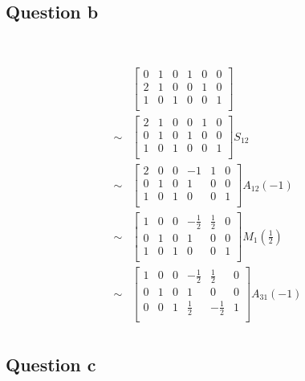 \documentclass{article}
\begin{document}
\subsection{Question b}

~

\begin{equation*}
\begin{split}
&\left[\begin{array}{ccc|ccc}
0 & 1 & 0 & 1 & 0 & 0\\
2 & 1 & 0 & 0 & 1 & 0\\
1 & 0 & 1 & 0 & 0 & 1\\
\end{array}\right]\\
\sim&\left[\begin{array}{ccc|ccc}
2 & 1 & 0 & 0 & 1 & 0\\
0 & 1 & 0 & 1 & 0 & 0\\
1 & 0 & 1 & 0 & 0 & 1\\
\end{array}\right] S_{12}\\
\sim&\left[\begin{array}{ccc|ccc}
2 & 0 & 0 & -1 & 1 & 0\\
0 & 1 & 0 & 1 & 0 & 0\\
1 & 0 & 1 & 0 & 0 & 1\\
\end{array}\right] A_{12}(-1)\\
\sim&\left[\begin{array}{ccc|ccc}
1 & 0 & 0 & -\frac{1}{2} & \frac{1}{2} & 0\\
0 & 1 & 0 & 1 & 0 & 0\\
1 & 0 & 1 & 0 & 0 & 1\\
\end{array}\right] M_{1}(\frac{1}{2})\\
\sim&\left[\begin{array}{ccc|ccc}
1 & 0 & 0 & -\frac{1}{2} & \frac{1}{2} & 0\\
0 & 1 & 0 & 1 & 0 & 0\\
0 & 0 & 1 & \frac{1}{2} & -\frac{1}{2} & 1\\
\end{array}\right] A_{31}(-1)\\
\end{split}
\end{equation*}

\subsection{Question c}
\end{document}
